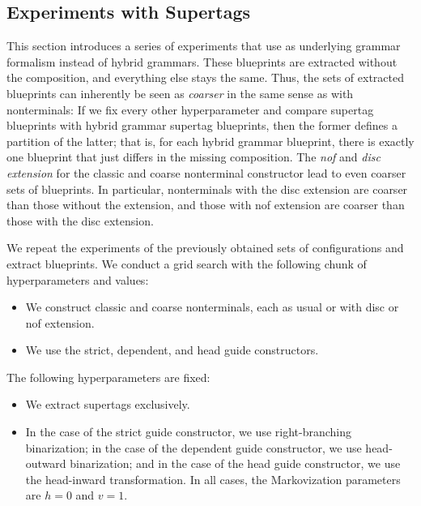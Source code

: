 \documentclass[../../document.tex]{subfiles}
\begin{document}
    \subsection{Experiments with  Supertags}\label{sec:gridsearch:dcp}
    This section introduces a series of experiments that use  as underlying grammar formalism instead of hybrid grammars.
    These blueprints are extracted without the  composition, and everything else stays the same.
    Thus, the sets of extracted blueprints can inherently be seen as \emph{coarser} in the same sense as with nonterminals:
        If we fix every other hyperparameter and compare  supertag blueprints with hybrid grammar supertag blueprints, then the former defines a partition of the latter; that is, for each hybrid grammar blueprint, there is exactly one  blueprint that just differs in the missing composition.
    The \emph{nof} and \emph{disc extension} for the classic and coarse nonterminal constructor lead to even coarser sets of blueprints.
    In particular, nonterminals with the disc extension are coarser than those without the extension, and those with nof extension are coarser than those with the disc extension.

    We repeat the experiments of the previously obtained sets of configurations and extract  blueprints.
    We conduct a grid search with the following chunk of hyperparameters and values:
    \begin{itemize}
        \item We construct classic and coarse nonterminals, each as usual or with disc or nof extension.
        \item We use the strict, dependent, and head guide constructors.
    \end{itemize}
    The following hyperparameters are fixed:
    \begin{itemize}
        \item We extract  supertags exclusively.
        \item In the case of the strict guide constructor, we use right-branching binarization; in the case of the dependent guide constructor, we use head-outward binarization; and in the case of the head guide constructor, we use the head-inward transformation. In all cases, the Markovization parameters are $h=0$ and $v=1$.
    \end{itemize}
\end{document}
